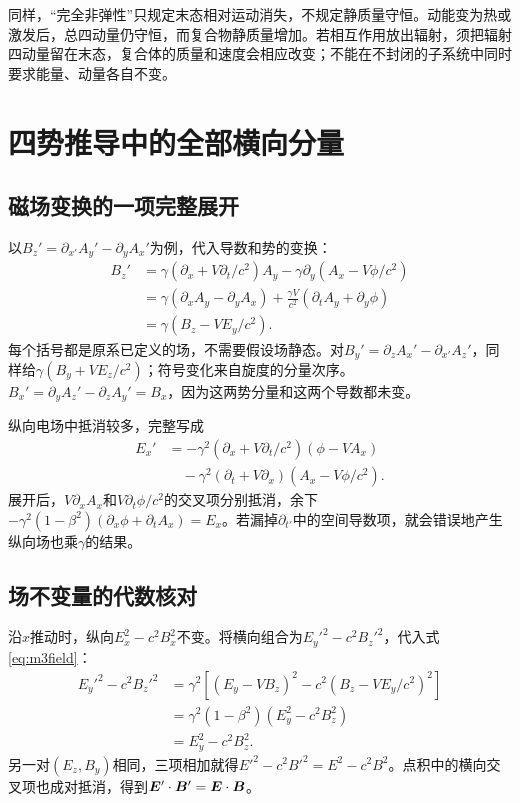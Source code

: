 同样，“完全非弹性”只规定末态相对运动消失，不规定静质量守恒。动能变为热或激发后，总四动量仍守恒，而复合物静质量增加。若相互作用放出辐射，须把辐射四动量留在末态，复合体的质量和速度会相应改变；不能在不封闭的子系统中同时要求能量、动量各自不变。

\section{四势推导中的全部横向分量}
\subsection{磁场变换的一项完整展开}
以$B_z'=\partial_{x'}A_y'-\partial_yA_x'$为例，代入导数和势的变换：
\begin{align*}
 B_z'&=\gamma(\partial_x+V\partial_t/c^2)A_y
 -\gamma\partial_y(A_x-V\phi/c^2)\\
 &=\gamma(\partial_xA_y-\partial_yA_x)
 +\frac{\gamma V}{c^2}(\partial_tA_y+\partial_y\phi)\\
 &=\gamma(B_z-VE_y/c^2).
\end{align*}
每个括号都是原系已定义的场，不需要假设场静态。对$B_y'=\partial_zA_x'-\partial_{x'}A_z'$，同样给$\gamma(B_y+VE_z/c^2)$；符号变化来自旋度的分量次序。$B_x'=\partial_yA_z'-\partial_zA_y'=B_x$，因为这两势分量和这两个导数都未变。

纵向电场中抵消较多，完整写成
\begin{align*}
 E_x'&=-\gamma^2(\partial_x+V\partial_t/c^2)(\phi-VA_x)\\
 &\quad-\gamma^2(\partial_t+V\partial_x)(A_x-V\phi/c^2).
\end{align*}
展开后，$V\partial_xA_x$和$V\partial_t\phi/c^2$的交叉项分别抵消，余下$-\gamma^2(1-\beta^2)(\partial_x\phi+\partial_tA_x)=E_x$。若漏掉$\partial_{t'}$中的空间导数项，就会错误地产生纵向场也乘$\gamma$的结果。

\subsection{场不变量的代数核对}
沿$x$推动时，纵向$E_x^2-c^2B_x^2$不变。将横向组合为$E_y'^2-c^2B_z'^2$，代入式\eqref{eq:m3field}：
\begin{align*}
 E_y'^2-c^2B_z'^2
 &=\gamma^2[(E_y-VB_z)^2-c^2(B_z-VE_y/c^2)^2]\\
 &=\gamma^2(1-\beta^2)(E_y^2-c^2B_z^2)\\
 &=E_y^2-c^2B_z^2.
\end{align*}
另一对$(E_z,B_y)$相同，三项相加就得$E'^2-c^2B'^2=E^2-c^2B^2$。点积中的横向交叉项也成对抵消，得到$\bm{E}'\cdot\bm{B}'=\bm{E}\cdot\bm{B}$。

